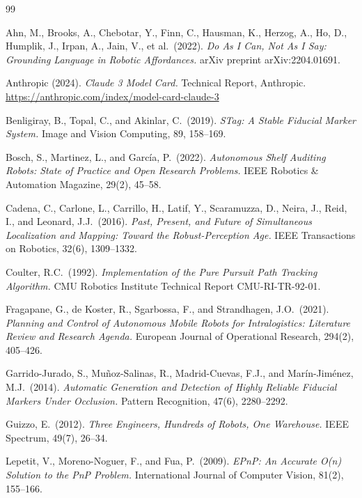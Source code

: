 \documentclass[12pt,a4paper]{report}
\begin{document}

\begin{thebibliography}{99}

Ahn, M., Brooks, A., Chebotar, Y., Finn, C., Hausman, K., Herzog, A., Ho, D., Humplik, J., Irpan, A., Jain, V., et al.\ (2022).
\textit{Do As I Can, Not As I Say: Grounding Language in Robotic Affordances.}
arXiv preprint arXiv:2204.01691.

Anthropic (2024).
\textit{Claude 3 Model Card.}
Technical Report, Anthropic.
\url{https://anthropic.com/index/model-card-claude-3}

Benligiray, B., Topal, C., and Akinlar, C.\ (2019).
\textit{STag: A Stable Fiducial Marker System.}
Image and Vision Computing, 89, 158–169.

Bosch, S., Martinez, L., and García, P.\ (2022).
\textit{Autonomous Shelf Auditing Robots: State of Practice and Open Research Problems.}
IEEE Robotics \& Automation Magazine, 29(2), 45–58.

Cadena, C., Carlone, L., Carrillo, H., Latif, Y., Scaramuzza, D., Neira, J., Reid, I., and Leonard, J.J.\ (2016).
\textit{Past, Present, and Future of Simultaneous Localization and Mapping: Toward the Robust-Perception Age.}
IEEE Transactions on Robotics, 32(6), 1309–1332.

Coulter, R.C.\ (1992).
\textit{Implementation of the Pure Pursuit Path Tracking Algorithm.}
CMU Robotics Institute Technical Report CMU-RI-TR-92-01.

Fragapane, G., de Koster, R., Sgarbossa, F., and Strandhagen, J.O.\ (2021).
\textit{Planning and Control of Autonomous Mobile Robots for Intralogistics: Literature Review and Research Agenda.}
European Journal of Operational Research, 294(2), 405–426.

Garrido-Jurado, S., Muñoz-Salinas, R., Madrid-Cuevas, F.J., and Marín-Jiménez, M.J.\ (2014).
\textit{Automatic Generation and Detection of Highly Reliable Fiducial Markers Under Occlusion.}
Pattern Recognition, 47(6), 2280–2292.

Guizzo, E.\ (2012).
\textit{Three Engineers, Hundreds of Robots, One Warehouse.}
IEEE Spectrum, 49(7), 26–34.

Lepetit, V., Moreno-Noguer, F., and Fua, P.\ (2009).
\textit{EPnP: An Accurate O(n) Solution to the PnP Problem.}
International Journal of Computer Vision, 81(2), 155–166.


\end{thebibliography}
\end{document}
